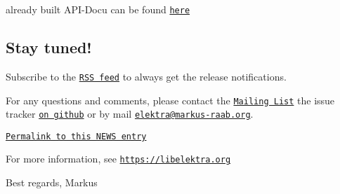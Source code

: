 already built A\+P\+I-\/\+Docu can be found \href{https://doc.libelektra.org/api/0.8.16/html/}{\tt here}

\subsection*{Stay tuned!}

Subscribe to the \href{https://doc.libelektra.org/news/feed.rss}{\tt R\+SS feed} to always get the release notifications.

For any questions and comments, please contact the \href{https://lists.sourceforge.net/lists/listinfo/registry-list}{\tt Mailing List} the issue tracker \href{https://git.libelektra.org/issues}{\tt on github} or by mail \href{mailto:elektra@markus-raab.org}{\tt elektra@markus-\/raab.\+org}.

\href{https://doc.libelektra.org/news/9c9247ee-ee9c-4f4a-a68e-76959def9b82.html}{\tt Permalink to this N\+E\+WS entry}

For more information, see \href{https://libelektra.org}{\tt https\+://libelektra.\+org}

Best regards, Markus 